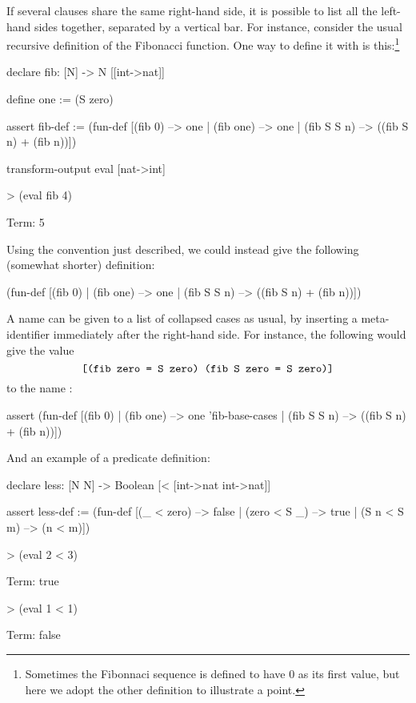 If several clauses share the same right-hand side, it is possible to
list all the left-hand sides together, separated by a
vertical bar. For instance, consider the usual recursive definition of 
the Fibonacci function. One way to define it with  
is this:\footnote{Sometimes the Fibonnaci sequence is defined to 
have 0 as its first value, but here we adopt the other definition
to illustrate a point.}
\begin{tcAthena}
declare fib: [N] -> N [[int->nat]]

define one := (S zero)

assert fib-def :=
  (fun-def [(fib 0)   --> one
          | (fib one) --> one
          | (fib S S n) --> ((fib S n) + (fib n))])

transform-output eval [nat->int]

> (eval fib 4)

Term: 5
\end{tcAthena}
Using the convention just described, we could instead give
the following (somewhat shorter) definition:
\begin{tcAthena}
  (fun-def [(fib 0) | (fib one) --> one
          | (fib S S n) --> ((fib S n) + (fib n))])
\end{tcAthena}
A name can be given to a list of collapsed cases as usual,
by inserting a meta-identifier immediately after the right-hand
side. For instance, the following would give the value 
$$\mbox{\tt [(fib zero = S zero) (fib S zero = S zero)]}$$
to the name : 
\begin{tcAthena}
assert (fun-def [(fib 0) | (fib one) --> one 'fib-base-cases
               | (fib S S n) --> ((fib S n) + (fib n))])
\end{tcAthena}
And an example of a predicate definition:
\begin{tcAthena}
declare less: [N N] -> Boolean [< [int->nat int->nat]]

assert less-def := 
  (fun-def [(_ < zero) --> false
          | (zero < S _) --> true
          | (S n < S m) --> (n < m)])


> (eval 2 < 3)

Term: true

> (eval 1 < 1)

Term: false
\end{tcAthena}

